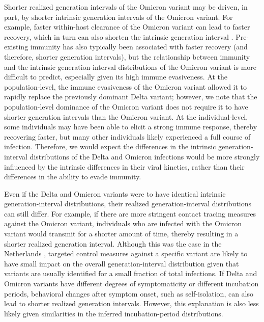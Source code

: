 \documentclass[12pt]{article}
\begin{document}
Shorter realized generation intervals of the Omicron variant may be driven, in part, by shorter intrinsic generation intervals of the Omicron variant.
For example, faster within-host clearance of the Omicron variant \citep{hay2022viral} can lead to faster recovery, which in turn can also shorten the intrinsic generation interval \citep{roberts2007model}.
Pre-existing immunity has also typically been associated with faster recovery \citep{kissler2021viral} (and therefore, shorter generation intervals), but the relationship between immunity and the intrinsic generation-interval distributions of the Omicron variant is more difficult to predict, especially given its high immune evasiveness.
At the population-level, the immune evasiveness of the Omicron variant allowed it to rapidly replace the previously dominant Delta variant;
however, we note that the population-level dominance of the Omicron variant does not require it to have shorter generation intervals than the Omicron variant.
At the individual-level, some individuals may have been able to elicit a strong immune response, thereby recovering faster, but many other individuals likely experienced a full course of infection.
Therefore, we would expect the differences in the intrinsic generation-interval distributions of the Delta and Omicron infections would be more strongly influenced by the intrinsic differences in their viral kinetics, rather than their differences in the ability to evade immunity.

Even if the Delta and Omicron variants were to have identical intrinsic generation-interval distributions, their realized generation-interval distributions can still differ.
For example, if there are more stringent contact tracing measures against the Omicron variant, individuals who are infected with the Omicron variant would transmit for a shorter amount of time, thereby resulting in a shorter realized generation interval.
Although this was the case in the Netherlands \citep{backer2021omicron}, targeted control measures against a specific variant are likely to have small impact on the overall generation-interval distribution given that variants are usually identified for a small fraction of total infections.
If Delta and Omicron variants have different degrees of symptomaticity or different incubation periods, behavioral changes after symptom onset, such as self-isolation, can also lead to shorter realized generation intervals.
However, this explanation is also less likely given similarities in the inferred incubation-period distributions.
\end{document}
